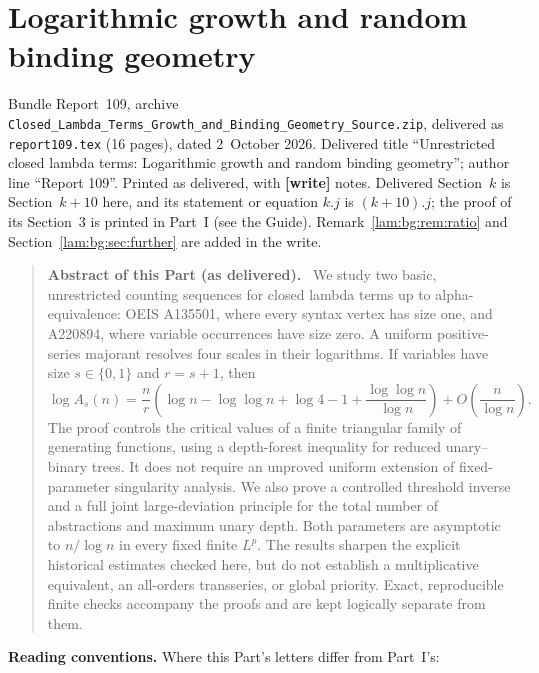 \documentclass[11pt,a4paper]{article}
\numberwithin{equation}{section}
\theoremstyle{remark}
\newcommand{\file}[1]{\nolinkurl{#1}}
\newenvironment{partabstract}{\begin{quote}\small\noindent\textbf{Abstract of this Part (as delivered).}\ }{\end{quote}}
\newcommand{\partsource}[1]{\par\noindent\begin{minipage}{\textwidth}\small #1\end{minipage}\par\medskip}
\begin{document}
\part{Logarithmic growth and random binding geometry}\label{lam:bg:part}
\partsource{Bundle Report~109, archive \file{Closed_Lambda_Terms_Growth_and_Binding_Geometry_Source.zip}, delivered as \file{report109.tex} (16 pages), dated 2~October 2026. Delivered title ``Unrestricted closed lambda terms: Logarithmic growth and random binding geometry''; author line ``Report 109''. Printed as delivered, with \textbf{[write]} notes. Delivered Section~$k$ is Section~$k+10$ here, and its statement or equation $k.j$ is $(k+10).j$; the proof of its Section~3 is printed in Part~I (see the Guide). Remark~\ref{lam:bg:rem:ratio} and Section~\ref{lam:bg:sec:further} are added in the write.}
\begin{partabstract}
We study two basic, unrestricted counting sequences for closed lambda terms up to alpha-equivalence: OEIS A135501, where every syntax vertex has size one, and A220894, where variable occurrences have size zero. A uniform positive-series majorant resolves four scales in their logarithms. If variables have size $s\in\{0,1\}$ and $r=s+1$, then
\[
 \log A_s(n)=\frac nr\left(\log n-\log\log n+\log4-1
       +\frac{\log\log n}{\log n}\right)+O\!\left(\frac n{\log n}\right).
\]
The proof controls the critical values of a finite triangular family of generating functions, using a depth-forest inequality for reduced unary--binary trees. It does not require an unproved uniform extension of fixed-parameter singularity analysis. We also prove a controlled threshold inverse and a full joint large-deviation principle for the total number of abstractions and maximum unary depth. Both parameters are asymptotic to $n/\log n$ in every fixed finite $L^p$. The results sharpen the explicit historical estimates checked here, but do not establish a multiplicative equivalent, an all-orders transseries, or global priority. Exact, reproducible finite checks accompany the proofs and are kept logically separate from them.
\end{partabstract}
\noindent\textbf{Reading conventions.} Where this Part's letters differ from Part~I's:
\end{document}
